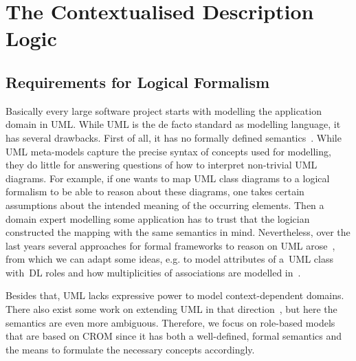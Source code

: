 
\chapter{The Contextualised Description Logic \texorpdfstring{\LMLO}{LM[LO]}}
\label{cha:context-dls}




\section{Requirements for Logical Formalism}
\label{sec:requirements-and-CDLs}

Basically every large software project starts with modelling the application domain in UML. While
UML is the de facto standard as modelling language, it has several drawbacks. First of all, it has
no formally defined semantics~\cite{FrEL-CSI98}. While UML meta-models capture the precise syntax of
concepts used for modelling, they do little for answering questions of how to interpret non-trivial
UML diagrams.  For example, if one wants to map UML class diagrams to a logical formalism to be able
to reason about these diagrams, one takes certain assumptions about the intended meaning of the
occurring elements. Then a domain expert modelling some application has to trust that the logician
constructed the mapping with the same semantics in mind. Nevertheless, over the last years several
approaches for formal frameworks to reason on UML
arose~\cite{Eva-WIFT98,CaCG-ISMIS02,StMS-UML03,SiSJ-OBJ04,BeCG-AI05,SiBH-IJSEKE08,AhNa-ICET10}, from
which we can adapt some ideas, e.g. to model attributes of a~UML class with~DL roles and how
multiplicities of associations are modelled in~\cite{CaCG-ISMIS02}.

Besides that, UML lacks expressive power to model context-dependent domains. There also exist some
work on extending UML in that direction~\cite{ShB-ICMB05}, but here the semantics are even more ambiguous.
Therefore, we focus on role-based models that are based on CROM since it has both a well-defined,
formal semantics and the means to formulate the necessary concepts accordingly.

